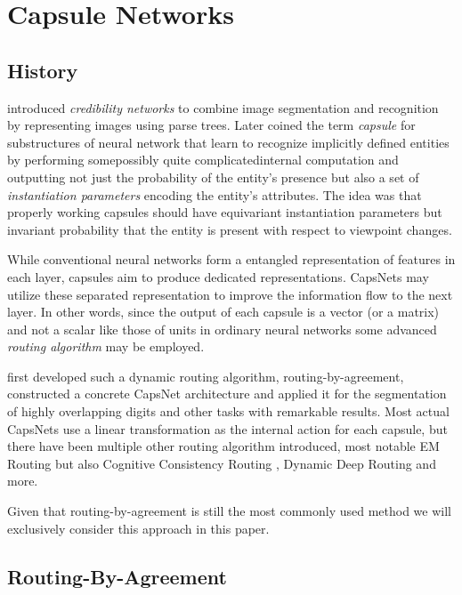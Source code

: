
\section{Capsule Networks}
\label{sec:capsules}

\subsection{History}

\citet{parse} introduced \emph{credibility networks} to combine image segmentation and recognition by representing images using parse trees.
Later \citet{transformingauto} coined the term \emph{capsule} for substructures of neural network that learn to recognize implicitly defined entities by performing some\textemdash possibly quite complicated\textemdash internal computation and outputting not just the probability of the entity's presence but also a set of \emph{instantiation parameters} encoding the entity's attributes.
The idea was that properly working capsules should have equivariant instantiation parameters but invariant probability that the entity is present with respect to viewpoint changes.

While conventional neural networks form a entangled representation of features in each layer, capsules aim to produce dedicated representations.
CapsNets may utilize these separated representation to improve the information flow to the next layer.
In other words, since the output of each capsule is a vector (or a matrix) and not a scalar like those of units in ordinary neural networks some advanced \emph{routing algorithm} may be employed.

\citet{capsules} first developed such a dynamic routing algorithm, routing-by-agreement, constructed a concrete CapsNet architecture and applied it for the segmentation of highly overlapping digits and other tasks with remarkable results.
Most actual CapsNets use a linear transformation as the internal action for each capsule, but there have been multiple other routing algorithm introduced, most notable EM Routing \citep{em} but also Cognitive Consistency Routing \citep{cognitive}, Dynamic Deep Routing \citep{training} and more.

Given that routing-by-agreement is still the most commonly used method we will exclusively consider this approach in this paper.

\subsection{Routing-By-Agreement}

